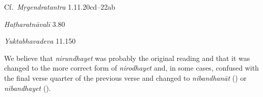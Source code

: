\begin{ekdosis}
\begin{sources}[hp02_003]
Cf.~\emph{Mṛgendratantra} 1.11.20cd--22ab

\begin{versinnote}
\end{versinnote}
\end{sources}

\begin{testimonia}[hp02_003]

\emph{Haṭharatnāvalī} 3.80

\begin{versinnote}
\end{versinnote}

\emph{Yuktabhavadeva} 11.150

\begin{versinnote}
\end{versinnote}

\end{testimonia}

\begin{philcomm}[hp02_003]

We believe that \emph{nirundhayet} was probably the original reading and that it was changed to the more correct form of \emph{nirodhayet} and, in some cases, confused with the final verse quarter of the previous verse and changed to \emph{nibandhanāt} (\textalpha) or \emph{nibandhayet} (\textbeta).%
\end{philcomm}


\end{ekdosis}
